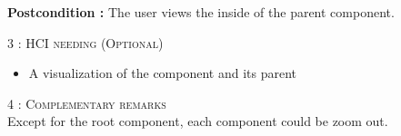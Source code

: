 \begin{flushleft}
    \textbf{\large Postcondition :} The user views the inside of the parent component.

    \BlackLine
    \textsc{\Large 3 : HCI needing (Optional)}\\[0.3cm]

    \begin{itemize}
        \item A visualization of the component and its parent
    \end{itemize}

    \BlackLine
    \textsc{\Large 4 : Complementary remarks}\\[0.3cm]

    Except for the root component, each component could be zoom out.

\end{flushleft}
